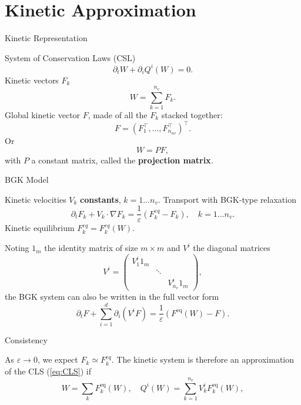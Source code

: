 \documentclass[english]{beamer}
\begin{document}
 \section{Kinetic Approximation}
\begin{frame}{Kinetic Representation}

System of Conservation Laws (CSL)
\begin{equation}
\partial_{t}W+\partial_{i}Q^{i}(W)=0.\label{eq:CLS}
\end{equation}
Kinetic vectors $F_{k}$
\[
W=\sum_{k=1}^{n_{v}}F_{k}.
\]
Global kinetic vector $F$, made of all the $F_{k}$ stacked together:
\[
F=(F_{1}^\intercal,\ldots,F_{n_{nv}}^\intercal)^\intercal.
\]
Or
\[
W=PF,
\]
with $P$ a constant matrix, called the \textbf{projection matrix}.
\end{frame}
%
\begin{frame}{BGK Model}

Kinetic velocities $V_{k}$ \textbf{constants}, $k=1\ldots n_{v}$.
Transport with BGK-type relaxation
\[
\partial_{t}F_{k}+V_{k}\cdot\nabla F_{k}=\frac{1}{\varepsilon}(F_{k}^{eq}-F_{k}),\quad k=1\ldots n_{v}.
\]
Kinetic equilibrium $F_{k}^{eq}=F_{k}^{eq}(W)$.

Noting $1_{m}$ the identity matrix of size $m	\times m$ and $V^{i}$
the diagonal matrices
\[
V^{i}=\left(\begin{array}{ccc}
V_{1}^{i}1_{m}\\
 & \ddots\\
 &  & V_{n_{v}}^{i}1_{m}
\end{array}\right),
\]
the BGK system can also be written in the full vector form
\[
\partial_{t}F+\sum_{i=1}^{d}\partial_{i}\left(V^{i}F\right)=\frac{1}{\varepsilon}(F^{\text{eq}}(W)-F).
\]

\end{frame}
%
\begin{frame}{Consistency}

As $\varepsilon\to0$, we expect $F_{k}\simeq F_{k}^{eq}$.
The kinetic system is therefore an approximation of the CLS (\ref{eq:CLS})
if
\begin{equation}
W=\sum_{k}F_{k}^{\text{eq}}(W),\quad Q^{i}(W)=\sum_{k=1}^{n_{v}}V_{k}^{i}F_{k}^{\text{eq}}(W),\label{eq:algebraic_consistence}
\end{equation}

\end{frame}
\end{document}
